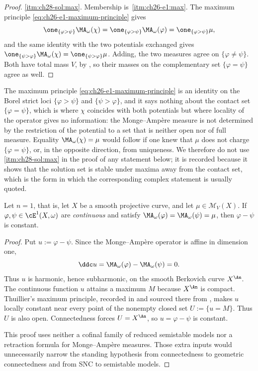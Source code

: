 \begin{proof}
\cref{itm:ch28-sol:max}.  Membership is
\,\cref{itm:ch26-e1:max}.  The maximum principle
\eqref{eq:ch26-e1-maximum-principle} gives
\[
 \one_{\{\varphi>\psi\}}\MA_\omega(\chi)
 =\one_{\{\varphi>\psi\}}\MA_\omega(\varphi)
 =\one_{\{\varphi>\psi\}}\mu ,
\]
and the same identity with the two potentials exchanged gives
$\one_{\{\psi>\varphi\}}\MA_\omega(\chi)
=\one_{\{\psi>\varphi\}}\mu$.  Adding, the two measures agree on
$\{\varphi\neq\psi\}$.  Both have total mass $V$, by
, so their masses on the complementary set
$\{\varphi=\psi\}$ agree as well.
\end{proof}

\begin{remark}
\label{rem:ch28-max-on-contact}
The maximum principle \eqref{eq:ch26-e1-maximum-principle} is an identity on
the Borel strict loci $\{\varphi>\psi\}$ and $\{\psi>\varphi\}$, and
it says nothing about the contact set $\{\varphi=\psi\}$, which is where
$\chi$ coincides with both potentials but where locality of the operator
gives no information: the Monge--Amp\`ere measure is not determined by the
restriction of the potential to a set that is neither open nor of full
measure.  Equality $\MA_\omega(\chi)=\mu$ would follow if one knew that
$\mu$ does not charge $\{\varphi=\psi\}$, or, in the opposite direction,
from uniqueness.  We therefore do not use \cref{itm:ch28-sol:max} in the proof
of any statement below; it is recorded because it shows that the solution set
is stable under maxima away from the contact set, which is the form in which
the corresponding complex statement is usually quoted.
\end{remark}

\begin{proposition}
\label{prop:ch28-curve-uniqueness}
Let $n=1$, that is, let $X$ be a smooth projective curve, and let
$\mu\in\mathcal M_V(X)$.  If $\varphi,\psi\in\cE^1(X,\omega)$ are
\emph{continuous} and satisfy
$\MA_\omega(\varphi)=\MA_\omega(\psi)=\mu$, then $\varphi-\psi$ is
constant.
\end{proposition}

\begin{proof}
Put $u:=\varphi-\psi$.  Since the Monge--Amp\`ere operator is affine in
dimension one,
\[
 \ddc u=\MA_\omega(\varphi)-\MA_\omega(\psi)=0.
\]
Thus $u$ is harmonic, hence subharmonic, on the smooth Berkovich curve
$X^{\An}$.  The continuous function $u$ attains a maximum $M$ because
$X^{\An}$ is compact.  Thuillier's maximum principle, recorded in
 and sourced there from
\cite[Proposition~3.1.11]{Thu05}, makes $u$ locally constant near every
point of the nonempty closed set $U:=\{u=M\}$.  Thus $U$ is also open.
Connectedness forces $U=X^{\An}$, so $u=\varphi-\psi$ is constant.

This proof uses neither a cofinal family of reduced semistable models nor a
retraction formula for Monge--Amp\`ere measures.  Those extra inputs would
unnecessarily narrow the standing hypothesis from connectedness to
geometric connectedness and from SNC to semistable models.
\end{proof}

